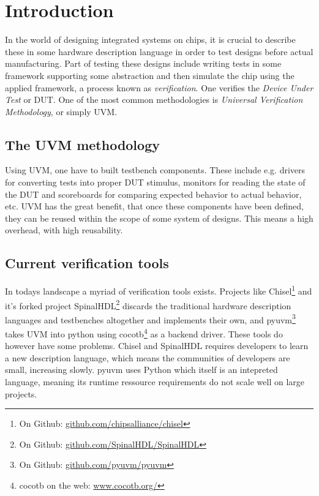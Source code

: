 \section{Introduction}\label{sec:02}
In the world of designing integrated systems on chips, it is crucial to describe these in some hardware description language in order to test designs before actual manufacturing. Part of testing these designs include writing tests in some framework supporting some abstraction and then simulate the chip using the applied framework, a process known as \emph{verification}. One verifies the \emph{Device Under Test} or DUT. One of the most common methodologies is \emph{Universal Verification Methodology}, or simply UVM.
\subsection{The UVM methodology}
Using UVM, one have to built testbench components. These include e.g. drivers for converting tests into proper DUT stimulus, monitors for reading the state of the DUT and scoreboards for comparing expected behavior to actual behavior, etc. UVM has the great benefit, that once these components have been defined, they can be reused within the scope of some system of designs. This means a high overhead, with high reusability.
\subsection{Current verification tools}
In todays landscape a myriad of verification tools exists. Projects like Chisel\footnote{On Github: \href{https://github.com/chipsalliance/chisel}{github.com/chipsalliance/chisel}} and it's forked project SpinalHDL\footnote{On Github: \href{https://github.com/SpinalHDL/SpinalHDL}{github.com/SpinalHDL/SpinalHDL}} discards the traditional hardware description languages and testbenches altogether and implements their own, and pyuvm\footnote{On Github: \href{https://github.com/pyuvm/pyuvm}{github.com/pyuvm/pyuvm}} takes UVM into python using cocotb\footnote{cocotb on the web: \href{https://www.cocotb.org/}{www.cocotb.org/}} as a backend driver. These tools do however have some problems. Chisel and SpinalHDL requires developers to learn a new description language, which means the communities of developers are small, increasing slowly. pyuvm uses Python which itself is an intepreted language, meaning its runtime ressource requirements do not scale well on large projects.
